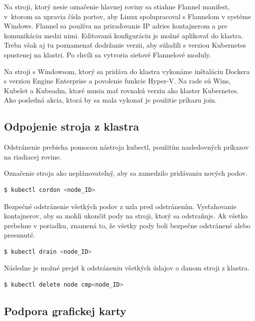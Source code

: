 Na stroji, ktorý nesie označenie hlavnej roviny sa stiahne Flannel manifest, v~ktorom sa upravia čísla portov, aby Linux spolupracoval s Flannelom v systéme Windows. Flannel sa používa na priraďovanie IP adries kontajnerom a pre komunikáciu medzi nimi. Editovanú konfiguráciu je možné aplikovať do klastra. Treba však aj tu poznamenať dodržanie verzii, aby súladili s verziou Kubernetes spustenej na klastri. Po chvíli sa vytvoria sieťové Flannelové moduly.

Na stroji s Windowsom, ktorý sa pridáva do klastra vykonáme inštaláciu Dockera s verziou Engine Enterprise a povolenie funkcie Hyper-V. Na rade sú Wins, Kubelet a Kubeadm, ktoré musia mať rovnakú verziu ako klaster Kubernetes. Ako posledná akcia, ktorá by sa mala vykonať je použitie príkazu join.

\subsection{Odpojenie stroja z klastra}

Odstránenie prebieha pomocou nástroja kubectl, použitím nasledovných príkazov na riadiacej rovine.

Označenie stroja ako neplánovateľný, aby sa zamedzilo pridávaniu nových podov.

\begin{lstlisting}[language=Bash]
    $ kubectl cordon <node_ID>
    \end{lstlisting}

Bezpečné odstránenie všetkých podov z uzla pred odstránením. Vysťahovanie kontajnerov, aby sa mohli ukončiť pody na stroji, ktorý sa odstraňuje. Ak všetko prebehne v poriadku, znamená to, že všetky pody boli bezpečne odstránené alebo presunuté.

\begin{lstlisting}[language=Bash]
    $ kubectl drain <node_ID>
    \end{lstlisting}

Následne je možné prejsť k odstráneniu všetkých údajov o danom stroji z klastra.

\begin{lstlisting}[language=Bash]
    $ kubectl delete node cmp<node_ID>
    \end{lstlisting}

\subsection{Podpora grafickej karty}

